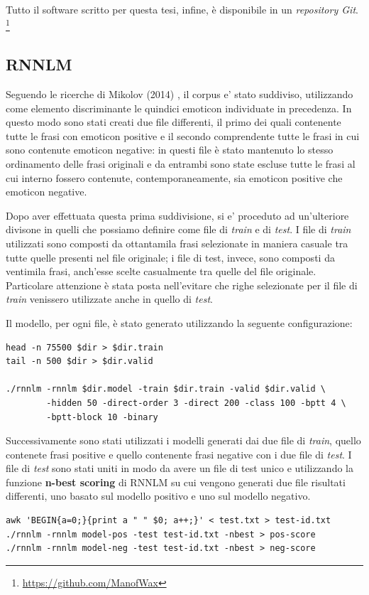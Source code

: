 \documentclass[a4paper,12pt,openright,twoside]{report}
\theoremstyle{definition}
\begin{document}
Tutto il software scritto per questa tesi, infine, è disponibile in un \emph{repository Git}.
\footnote{\url{https://github.com/ManofWax}}

\subsection{RNNLM}
\label{sss:rnnlm}
Seguendo le ricerche di Mikolov (2014) %
, il corpus e' stato suddiviso, utilizzando come elemento discriminante le 
quindici emoticon individuate in precedenza.
In questo modo
sono stati creati due file differenti,
il primo dei quali contenente tutte le frasi con emoticon positive e il secondo comprendente
tutte le frasi in cui sono contenute emoticon negative: in questi file è stato mantenuto lo stesso ordinamento delle frasi originali
e da entrambi sono state escluse tutte le frasi al cui interno fossero contenute, 
contemporaneamente, sia emoticon positive che emoticon negative. 

Dopo aver effettuata questa prima suddivisione, si e' proceduto ad un'ulteriore
divisone in quelli che possiamo definire come file di \emph{train} e di \emph{test}.
I file di \emph{train} utilizzati sono composti da ottantamila frasi selezionate in maniera casuale tra tutte quelle presenti nel file originale;
i file di test, invece, sono composti da ventimila frasi,
anch'esse scelte casualmente tra quelle del file originale.
Particolare attenzione è stata posta nell'evitare che righe selezionate per il file di \emph{train}
venissero utilizzate anche in quello di \emph{test}.

Il modello, per ogni file, è stato generato utilizzando la seguente configurazione:

\begin{verbatim}
head -n 75500 $dir > $dir.train
tail -n 500 $dir > $dir.valid

./rnnlm -rnnlm $dir.model -train $dir.train -valid $dir.valid \
        -hidden 50 -direct-order 3 -direct 200 -class 100 -bptt 4 \
        -bptt-block 10 -binary
\end{verbatim}

Successivamente sono stati utilizzati i modelli generati dai due file di \emph{train}, 
quello contenete
frasi positive e quello contenente frasi negative con i due file di \emph{test}. 
I file di \emph{test}
sono stati uniti in modo da avere un file di test unico e utilizzando la funzione 
\textbf{n-best scoring} di RNNLM
su cui vengono generati due file risultati differenti, uno basato sul
modello positivo e uno sul modello negativo.
\begin{verbatim}
awk 'BEGIN{a=0;}{print a " " $0; a++;}' < test.txt > test-id.txt
./rnnlm -rnnlm model-pos -test test-id.txt -nbest > pos-score
./rnnlm -rnnlm model-neg -test test-id.txt -nbest > neg-score
\end{verbatim}
\end{document}
